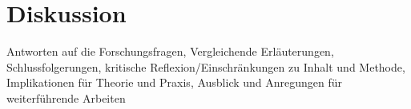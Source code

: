 \section{Diskussion}
\label{diskussion}

Antworten auf die Forschungsfragen, Vergleichende Erläuterungen, Schlussfolgerungen, kritische Reflexion/Einschränkungen zu Inhalt und Methode, Implikationen für Theorie und Praxis, Ausblick und Anregungen für weiterführende Arbeiten

\lipsum[1]

